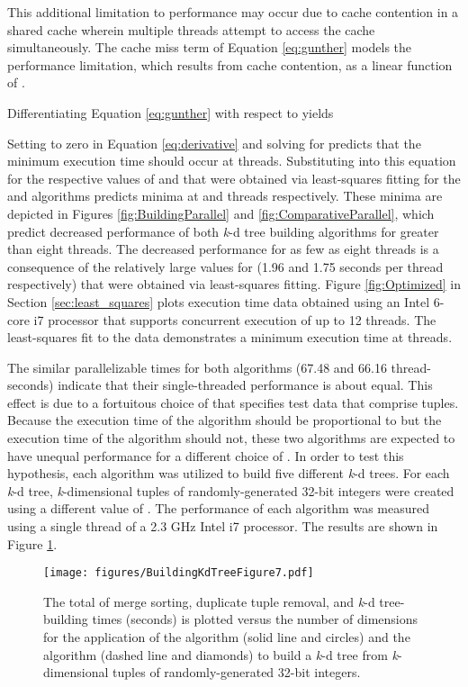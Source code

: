 \documentclass{sig-alternate}
\begin{document}
This additional limitation to performance may occur due to cache contention in a shared cache wherein multiple threads attempt to access the cache simultaneously.  The cache miss term  of Equation \ref{eq:gunther} models the performance limitation, which results from cache contention, as a linear function of  \cite{Gunther}.

Differentiating Equation \ref{eq:gunther} with respect to  yields

Setting  to zero in Equation \ref{eq:derivative} and solving for  predicts that the minimum execution time should occur at  threads.  Substituting into this equation for  the respective values of  and  that were obtained via least-squares fitting for the  and  algorithms predicts minima at  and  threads respectively.  These minima are depicted in Figures \ref{fig:BuildingParallel} and \ref{fig:ComparativeParallel}, which predict decreased performance of both \emph{k}-d tree building algorithms for greater than eight threads.  The decreased performance for as few as eight threads is a consequence of the relatively large values for  (1.96 and 1.75 seconds per thread respectively) that were obtained via least-squares fitting.  Figure \ref{fig:Optimized} in Section \ref{sec:least_squares} plots execution time data obtained using an Intel 6-core i7 processor that supports concurrent execution of up to 12 threads. The least-squares fit to the data demonstrates a minimum execution time at  threads.

The similar parallelizable times  for both algorithms (67.48 and 66.16 thread-seconds) indicate that their single-threaded performance is about equal.  This effect is due to a fortuitous choice of  that specifies test data that comprise  tuples.  Because the execution time of the  algorithm should be proportional to  but the execution time of the  algorithm should not, these two algorithms are expected to have unequal performance for a different choice of .  In order to test this hypothesis, each algorithm was utilized to build five different \emph{k}-d trees.  For each \emph{k}-d tree,  \emph{k}-dimensional tuples of randomly-generated 32-bit integers were created using a different value of .  The performance of each algorithm was measured using a single thread of a 2.3 GHz Intel i7 processor.  The results are shown in Figure \ref{fig:Dimensions}.

\begin{figure}[h]
\centering
\centerline{\texttt{[image: figures/BuildingKdTreeFigure7.pdf]}}
\caption{The total of merge sorting, duplicate tuple removal, and \emph{k}-d tree-building times (seconds) is plotted versus the number of dimensions  for the application of the  algorithm (solid line and circles) and the  algorithm (dashed line and diamonds) to build a \emph{k}-d tree from  \emph{k}-dimensional tuples of randomly-generated 32-bit integers.}
\label{fig:Dimensions}
\end{figure}
\end{document}
